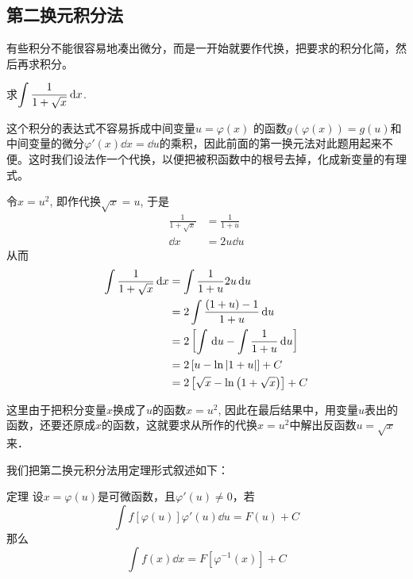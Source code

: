 \subsection{第二换元积分法}

有些积分不能很容易地凑出微分，而是一开始就要作代换，把要求的积分化简，然后再求积分。

\begin{example}
    求$\displaystyle\int \dfrac{1}{1+\sqrt{x}}\,{\rm d} x$.
\end{example}

\begin{solution}
    这个积分的表达式不容易拆成中间变量$u=\varphi(x)$
的函数$g(\varphi(x))=g(u)$和中间变量的微分$\varphi'(x)\dd x=\dd u$的乘积，因此前面的第一换元法对此题用起来不便。这时我们设法作一个代换，以便把被积函数中的根号去掉，化成新变量的有理式。

令$x=u^2$, 即作代换$\sqrt{x}=u$, 于是
\[\begin{split}
    \frac{1}{1+\sqrt{x}}&=\frac{1}{1+u}\\
    \dd x&=2u\dd u
\end{split}\]
从而
\[\begin{split}
    \displaystyle\int \dfrac{1}{1+\sqrt{x}}\,{\rm d} x&=\int \dfrac{1}{1+u}2u\,{\rm d} u\\
    &=2\int \dfrac{(1+u)-1}{1+u}\,{\rm d} u\\
    &=2\left[\int \,{\rm d} u-\int \dfrac{1}{1+u}\,{\rm d} u\right]\\
    &=2\left[u-\ln |1+u|\right]+C\\
    &=2\left[\sqrt{x}-\ln\left(1+\sqrt{x}\right)\right]+C
\end{split}\]
\end{solution}

这里由于把积分变量$x$换成了$u$的函数$x=u^2$, 因此在最后结果中，用变量$u$表出的函数，还要还原成$x$的函数，这就要求从所作的代换$x=u^2$中解出反函数$u=\sqrt{x}$来．

我们把第二换元积分法用定理形式叙述如下：

\begin{blk}{定理}
设$x=\varphi(u)$是可微函数，且$\varphi'(u)\ne 0$，若
\begin{equation}
    \int f[\varphi(u)]\varphi'(u)\dd u=F(u)+C
\end{equation}
那么
\begin{equation}
    \int f(x)\dd x=F\left[\varphi^{-1}(x)\right]+C
\end{equation}
\end{blk}

